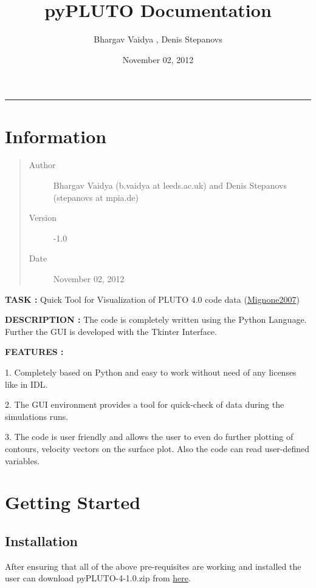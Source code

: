 \documentclass[letterpaper,10pt,english]{sphinxmanual}
\title{pyPLUTO Documentation}
\date{November 02, 2012}
\author{Bhargav Vaidya , Denis Stepanovs}
\begin{document}
\maketitle
\tableofcontents
{}\label{index::doc}

\bigskip\hrule{}\bigskip





\chapter{Information}
\label{index:pypluto-code}\label{index:information}\begin{quote}\begin{description}
\item[{Author}] \leavevmode
Bhargav Vaidya (b.vaidya at leeds.ac.uk) and Denis Stepanovs (stepanovs at mpia.de)

\item[{Version}] -1.0

\item[{Date}] \leavevmode
November 02, 2012

\end{description}\end{quote}

\textbf{TASK :}  Quick Tool for Visualization of PLUTO 4.0 code data (\href{http://adsabs.harvard.edu/abs/2007ApJS..170..228M}{Mignone2007})

\textbf{DESCRIPTION :}
The code is completely written using the Python Language.
Further the GUI is developed with the Tkinter Interface.

\textbf{FEATURES :}

1. Completely based on Python and easy to work without need of any
licenses like in IDL.

2. The GUI environment provides a tool for quick-check of data during
the simulations runs.

3. The code is user friendly and allows the user to even do further
plotting of contours, velocity vectors on the surface plot. Also the code can read user-defined variables.


\chapter{Getting Started}
\label{index:getting-started}\label{index:mignone2007}

\section{Installation}
\label{install:installation}\label{install::doc}
After ensuring that all of the above pre-requisites are working and
installed the user can download  pyPLUTO-4-1.0.zip from \href{http://www.ast.leeds.ac.uk/~phybva/Bhargav\_Vaidya/Simulations.html}{here}.
\end{document}
